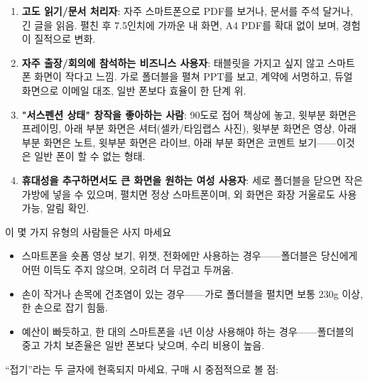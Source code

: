 \begin{enumerate}
  \item \textbf{고도 읽기/문서 처리자}: 자주 스마트폰으로 PDF를 보거나, 문서를 주석 달거나, 긴 글을 읽음. 펼친 후 7.5인치에 가까운 내 화면, A4 PDF를 확대 없이 보며, 경험이 질적으로 변화.
  \item \textbf{자주 출장/회의에 참석하는 비즈니스 사용자}: 태블릿을 가지고 싶지 않고 스마트폰 화면이 작다고 느낌. 가로 폴더블을 펼쳐 PPT를 보고, 계약에 서명하고, 듀얼 화면으로 이메일 대조, 일반 폰보다 효율이 한 단계 위.
  \item \textbf{"서스펜션 상태" 창작을 좋아하는 사람}: 90도로 접어 책상에 놓고, 윗부분 화면은 프레이밍, 아래 부분 화면은 셔터(셀카/타임랩스 사진), 윗부분 화면은 영상, 아래 부분 화면은 노트, 윗부분 화면은 라이브, 아래 부분 화면은 코멘트 보기——이것은 일반 폰이 할 수 없는 형태.
  \item \textbf{휴대성을 추구하면서도 큰 화면을 원하는 여성 사용자}: 세로 폴더블을 닫으면 작은 가방에 넣을 수 있으며, 펼치면 정상 스마트폰이며, 외 화면은 화장 거울로도 사용 가능, 알림 확인.
\end{enumerate}

\begin{tcbwarn}{이 몇 가지 유형의 사람들은 사지 마세요}
\begin{itemize}
  \item 스마트폰을 숏폼 영상 보기, 위챗, 전화에만 사용하는 경우——폴더블은 당신에게 어떤 이득도 주지 않으며, 오히려 더 무겁고 두꺼움.
  \item 손이 작거나 손목에 건초염이 있는 경우——가로 폴더블을 펼치면 보통 230g 이상, 한 손으로 잡기 힘듦.
  \item 예산이 빠듯하고, 한 대의 스마트폰을 4년 이상 사용해야 하는 경우——폴더블의 중고 가치 보존율은 일반 폰보다 낮으며, 수리 비용이 높음.
\end{itemize}

\end{tcbwarn}


“접기”라는 두 글자에 현혹되지 마세요, 구매 시 중점적으로 볼 점:


